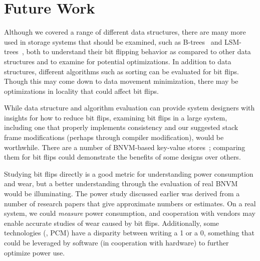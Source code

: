 
\section{Future Work}
\label{sec:fw}

Although we covered a range of different data structures, there are many more
used in storage systems that should be examined, such as
B-trees~\cite{btree} and
LSM-trees~\cite{lsmtree}, both to understand their bit flipping behavior as compared to
other data structures and to examine for potential optimizations. In
addition to data structures, different algorithms such as sorting can be
evaluated for bit flips. Though this may come
down to data movement minimization, there may be optimizations in locality that
could affect bit flips.

While data structure and algorithm evaluation can provide system designers with
insights for how to reduce bit flips, examining bit flips in a large system,
including one that properly implements consistency and our suggested stack frame modifications
(perhaps through compiler modification),
would be worthwhile.
There are a number of BNVM-based key-value stores~\cite{kv1}; comparing them
for bit flips could demonstrate the benefits of some designs
over others.

Studying bit flips directly is a good metric for understanding
power consumption and wear, but a better understanding through the evaluation of
real BNVM would be illuminating. The power study discussed earlier was
derived from a number of research papers that give approximate numbers or
estimates. On a real system, we could \textit{measure} power
consumption, and cooperation with vendors may enable accurate studies of
wear caused by bit flips. Additionally, some technologies (\eg, PCM) have a disparity between writing
a 1 or a 0, something that could be leveraged by software (in cooperation with hardware) to
further optimize power use.

